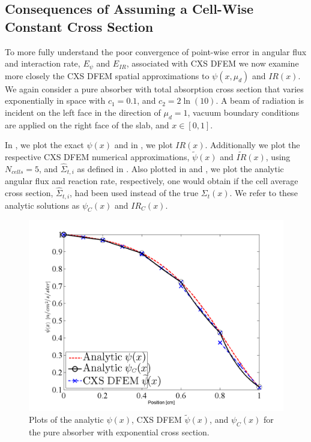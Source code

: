 \subsection{Consequences of Assuming a Cell-Wise Constant Cross Section}

To more fully understand the poor convergence of point-wise error in angular flux and interaction rate, $E_{\psi}$ and $E_{IR}$, associated with CXS DFEM  we now examine more closely the CXS DFEM spatial approximations to $\psi(x,\mu_d)$ and $IR(x)$. 
We again consider a pure absorber with total absorption cross section that varies exponentially in space with $c_1 = 0.1$, and $c_2 = 2\ln(10)$.  
A beam of radiation is incident on the left face in the direction of $\mu_d=1$, vacuum boundary conditions are applied on the right face of the slab, and $x\in[0, 1]$.    

In , we plot the exact $\psi(x)$ and in , we plot $IR(x)$.  
Additionally we plot the respective CXS DFEM numerical approximations, $\widetilde{\psi}(x)$ and $\widetilde{IR}(x)$, using $N_{cells}=5$, and $\hat{\Sigma}_{t,i}$ as defined in . 
Also plotted in  and , we plot the analytic angular flux and reaction rate, respectively, one would obtain if the cell average cross section, $\hat{\Sigma}_{t,i}$, had been used instead of the true $\Sigma_t(x)$.
We refer to these analytic solutions as $\psi_C(x)$ and $IR_C(x)$.
\begin{figure}[!hbp]
\centering
\includegraphics[width=12cm]{chapter3_variable_xs/Psi_Blades.png}
\caption{Plots of the analytic $\psi(x)$, CXS DFEM $\widetilde{\psi}(x)$, and $\psi_C(x)$ for the pure absorber with exponential cross section.}
\label{fig:cxs_blades_psi}
\end{figure}

